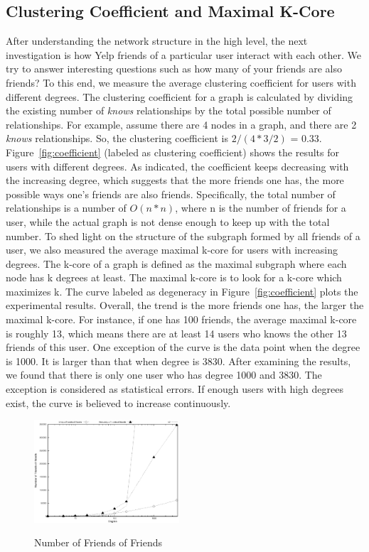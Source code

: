 \documentclass[10pt]{sig-alternate-10pt}   	%
\begin{document}
\subsection{Clustering Coefficient and Maximal K-Core}
After understanding the network structure in the high level, the next investigation is how Yelp friends of a particular user 
interact with each other. We try to answer interesting questions such as how many of your friends are also friends? To this 
end, we measure the average clustering coefficient for users with different degrees. The clustering coefficient for a 
graph is calculated by dividing the existing number of  \textit{knows} relationships by the total possible number 
of relationships. For example, assume there are  4 nodes in a graph, and there are  2 \textit{knows} relationships. 
So, the clustering coefficient is $2 / (4*3/2)$ = 0.33. Figure~\ref{fig:coefficient} (labeled as clustering coefficient) shows the results 
for users with different degrees.  As indicated, the coefficient keeps decreasing with the increasing degree, which 
suggests that the more friends one has, the more possible ways one's friends are also friends. Specifically, the total 
number of relationships is a number of $O(n*n)$, where n is the number of friends for a user, while the actual graph is 
not dense enough to keep up with the total number. To shed light on the structure of the subgraph formed by all friends of 
a user, we also measured the average maximal k-core for users with increasing degrees. The k-core of a graph is defined 
as the maximal subgraph where each node has k degrees at least. The maximal k-core is to look for a k-core 
which maximizes k.  The curve labeled as degeneracy in Figure~\ref{fig:coefficient} plots the experimental results. 
Overall, the trend is the more friends 
one has, the larger the maximal k-core. For instance, if one has 100 friends, the average maximal k-core is roughly 13,
which means there are at least 14 users who knows the other 13 friends of this user.  One exception of the curve is 
the data point when the degree is 1000. It is larger than that when degree is 3830. After examining the results, we found
that there is only one user who has degree 1000 and 3830. The exception is considered as statistical errors. If enough 
users with high degrees exist, the curve is believed to increase continuously. 

\begin{figure}[t]
  \centering
  \caption{Number of Friends of Friends} 
       \includegraphics[width=0.48\textwidth]{figures/fof.eps}
  \label{fig:fof}
\end{figure}
\end{document}

